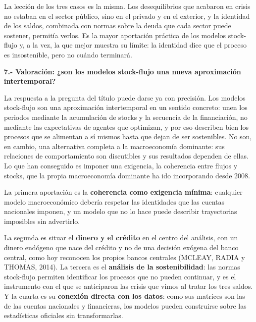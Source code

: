 \documentclass[10pt,a4paper]{article}
\begin{document}
La lección de los tres casos es la misma. Los desequilibrios que acabaron en crisis no estaban en el sector público, sino en el privado y en el exterior, y la identidad de los saldos, combinada con normas sobre la deuda que cada sector puede sostener, permitía verlos. Es la mayor aportación práctica de los modelos stock-flujo y, a la vez, la que mejor muestra su límite: la identidad dice que el proceso es insostenible, pero no cuándo terminará.

\textbf{7.- Valoración: ¿son los modelos stock-flujo una nueva aproximación intertemporal?}

La respuesta a la pregunta del título puede darse ya con precisión. Los modelos stock-flujo son una aproximación intertemporal en un sentido concreto: unen los periodos mediante la acumulación de stocks y la secuencia de la financiación, no mediante las expectativas de agentes que optimizan, y por eso describen bien los procesos que se alimentan a sí mismos hasta que dejan de ser sostenibles. No son, en cambio, una alternativa completa a la macroeconomía dominante: sus relaciones de comportamiento son discutibles y sus resultados dependen de ellas. Lo que han conseguido es imponer una exigencia, la coherencia entre flujos y stocks, que la propia macroeconomía dominante ha ido incorporando desde 2008.

La primera aportación es la \textbf{coherencia como exigencia mínima}: cualquier modelo macroeconómico debería respetar las identidades que las cuentas nacionales imponen, y un modelo que no lo hace puede describir trayectorias imposibles sin advertirlo. 

La segunda es situar el \textbf{dinero y el crédito} en el centro del análisis, con un dinero endógeno que nace del crédito y no de una decisión exógena del banco central, como hoy reconocen los propios bancos centrales (MCLEAY, RADIA y THOMAS, 2014). La tercera es el \textbf{análisis de la sostenibilidad}: las normas stock-flujo permiten identificar los procesos que no pueden continuar, y es el instrumento con el que se anticiparon las crisis que vimos al tratar los tres saldos. Y la cuarta es su \textbf{conexión directa con los datos}: como sus matrices son las de las cuentas nacionales y financieras, los modelos pueden construirse sobre las estadísticas oficiales sin transformarlas.
\end{document}
